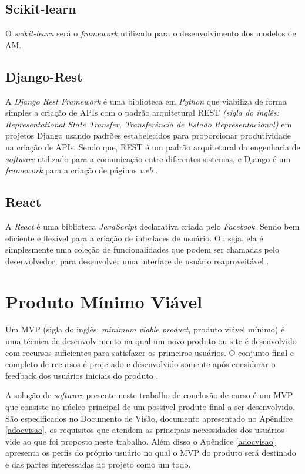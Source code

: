 \subsection{Scikit-learn}
O \textit{scikit-learn} será o \textit{framework} utilizado para o desenvolvimento dos modelos de AM.
\subsection{Django-Rest}

A \textit{Django Rest Framework} é uma biblioteca em \textit{Python} que viabiliza de forma simples a criação de APIs com o padrão arquitetural REST \textit{(sigla do inglês: Representational State Transfer, Transferência de Estado Representacional)} em projetos Django usando padrões estabelecidos para proporcionar produtividade na criação de APIs. Sendo que, REST é um padrão arquitetural da engenharia de \textit{software} utilizado para a comunicação entre diferentes sistemas, e Django é um \textit{framework} para a criação de páginas \textit{web} \cite{christie2011django}.

\subsection{React}

A \textit{React} é uma biblioteca \textit{JavaScript} declarativa criada pelo \textit{Facebook}. Sendo bem eficiente e flexível para a criação de interfaces de usuário. Ou seja, ela é simplesmente uma coleção de funcionalidades que podem ser chamadas pelo desenvolvedor, para desenvolver uma interface de usuário reaproveitável \cite{reactjs}.

\section{Produto Mínimo Viável}

Um MVP (sigla do inglês: \textit{minimum viable product}, produto viável mínimo) é uma técnica de desenvolvimento na qual um novo produto ou site é desenvolvido com recursos suficientes para satisfazer os primeiros usuários. O conjunto final e completo de recursos é projetado e desenvolvido somente após considerar o feedback dos usuários iniciais do produto \cite{MVP}.

A solução de \textit{software} presente neste trabalho de conclusão de curso é um MVP que consiste no núcleo principal de um possível produto final a ser desenvolvido. São especificados no Documento de Visão, documento apresentado no Apêndice \ref{adocvisao}, os requisitos que atendem as principais necessidades dos usuários vide ao que foi proposto neste trabalho. Além disso o Apêndice \ref{adocvisao} apresenta os perfis do próprio usuário no qual o MVP do produto será destinado e das partes interessadas no projeto como um todo.
